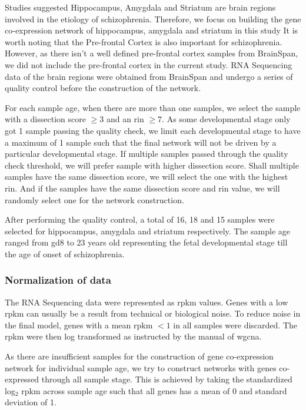 Studies suggested Hippocampus\citep{Velakoulis2006,Nugent2007}, Amygdala and Striatum\citep{Simpson2010} are brain regions involved in the etiology of schizophrenia. 
Therefore, we focus on building the gene co-expression network of hippocampus, amygdala and striatum in this study
It is worth noting that the Pre-frontal Cortex is also important for schizophrenia. 
However, as there isn't a well defined pre-frontal cortex samples from BrainSpan, we did not include the pre-frontal cortex in the current study.
RNA Sequencing data of the brain regions were obtained from BrainSpan and undergo a series of quality control before the construction of the network. 

For each sample age, when there are more than one samples, we select the sample with a dissection score $\ge3$ and an \gls{rin} $\ge7$. 
As some developmental stage only got 1 sample passing the quality check, we limit each developmental stage to have a maximum of 1 sample such that the final network will not be driven by a particular developmental stage. 
If multiple samples passed through the quality check threshold, we will prefer sample with higher dissection score. 
Shall multiple samples have the same dissection score, we will select the one with the highest \gls{rin}. 
And if the samples have the same dissection score and \gls{rin} value, we will randomly select one for the network construction.

After performing the quality control, a total of 16, 18 and 15 samples were selected for hippocampus, amygdala and striatum respectively.
The sample age ranged from \gls{gd}8 to 23 years old representing the fetal developmental stage till the age of onset of schizophrenia.

\subsubsection{Normalization of data}
The RNA Sequencing data were represented as \gls{rpkm} values. 
Genes with a low \gls{rpkm} can usually be a result from technical or biological noise\citep{Hart2013}.
To reduce noise in the final model, genes with a mean \gls{rpkm} $< 1$ in all samples were discarded. 
The \gls{rpkm} were then log transformed as instructed by the manual of \gls{wgcna}\citep{Langfelder2008}.

As there are insufficient samples for the construction of gene co-expression network for individual sample age, we try to construct networks with genes co-expressed through all sample stage. 
This is achieved by taking the standardized log$_2$ \gls{rpkm} across sample age such that all genes has a mean of 0 and standard deviation of 1.

